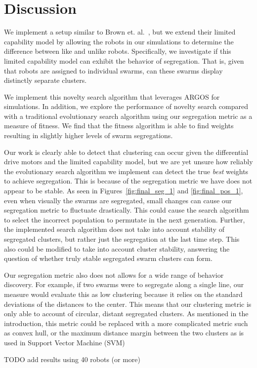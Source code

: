 \section{Discussion}
\label{sec:disc}

We implement a setup similar to Brown et. al.~\cite{c1}, but we extend their limited capability model by allowing the robots in our simulations to determine the difference between like and unlike robots. 
Specifically, we investigate if this limited capability model can exhibit the behavior of segregation.
That is, given that robots are assigned to individual swarms, can these swarms display distinctly separate clusters. 

We implement this novelty search algorithm that leverages ARGOS for simulations.
In addition, we explore the performance of novelty search compared with a traditional evolutionary search algorithm using our segregation metric as a measure of fitness. 
We find that the fitness algorithm is able to find weights resulting in slightly higher levels of swarm segregations. 

Our work is clearly able to detect that clustering can occur given the differential drive motors and the limited capability model, but we are yet unsure how reliably the evolutionary search algorithm we implement can detect the true \emph{best} weights to achieve segregation.
This is because of the segregation metric we have does not appear to be stable. 
As seen in Figures~\ref{fig:final_seg_1} and \ref{fig:final_pos_1}, even when visually the swarms are segregated, small changes can cause our segregation metric to fluctuate drastically. 
This could cause the search algorithm to select the incorrect population to permutate in the next generation. 
Further, the implemented search algorithm does not take into account stability of segregated clusters, but rather just the segregation at the last time step. 
This also could be modified to take into account cluster stability, answering the question of whether truly stable segregated swarm clusters can form. 

Our segregation metric also does not allows for a wide range of behavior discovery. 
For example, if two swarms were to segregate along a single line, our measure would evaluate this as low clustering because it relies on the standard deviations of the distances to the center.
This means that our clustering metric is only able to account of circular, distant segregated clusters. 
As mentioned in the introduction, this metric could be replaced with a more complicated metric such as convex hull, or the maximum distance margin between the two clusters as is used in Support Vector Machine (SVM)

TODO add results using 40 robots (or more)

